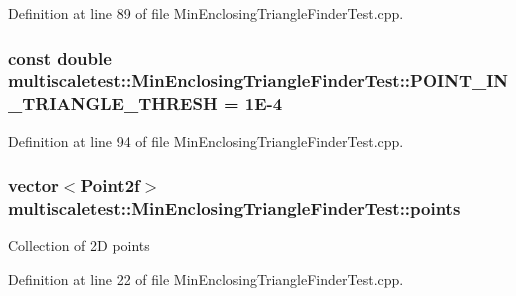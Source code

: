 \-Definition at line 89 of file \-Min\-Enclosing\-Triangle\-Finder\-Test.\-cpp.

\hypertarget{classmultiscaletest_1_1MinEnclosingTriangleFinderTest_a2193dc179eeea5624b8e9a8b1964c78e}{
\subsubsection[{\-P\-O\-I\-N\-T\-\_\-\-I\-N\-\_\-\-T\-R\-I\-A\-N\-G\-L\-E\-\_\-\-T\-H\-R\-E\-S\-H}]{\setlength{\rightskip}{0pt plus 5cm}const double {\bf multiscaletest\-::\-Min\-Enclosing\-Triangle\-Finder\-Test\-::\-P\-O\-I\-N\-T\-\_\-\-I\-N\-\_\-\-T\-R\-I\-A\-N\-G\-L\-E\-\_\-\-T\-H\-R\-E\-S\-H} = 1\-E-\/4}}\label{classmultiscaletest_1_1MinEnclosingTriangleFinderTest_a2193dc179eeea5624b8e9a8b1964c78e}


\-Definition at line 94 of file \-Min\-Enclosing\-Triangle\-Finder\-Test.\-cpp.

\hypertarget{classmultiscaletest_1_1MinEnclosingTriangleFinderTest_ace108c67a933a0d79c05b304a9683764}{
\subsubsection[{points}]{\setlength{\rightskip}{0pt plus 5cm}vector$<$\-Point2f$>$ {\bf multiscaletest\-::\-Min\-Enclosing\-Triangle\-Finder\-Test\-::points}}}\label{classmultiscaletest_1_1MinEnclosingTriangleFinderTest_ace108c67a933a0d79c05b304a9683764}
\-Collection of 2\-D points 

\-Definition at line 22 of file \-Min\-Enclosing\-Triangle\-Finder\-Test.\-cpp.

